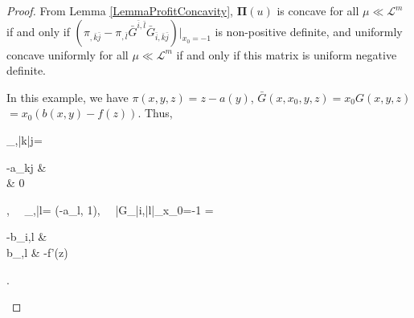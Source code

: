 \begin{proof}%
	From Lemma \ref{LemmaProfitConcavity}, $\pmb \Pi(u)$ is concave for all $\mu\ll \mathcal{L}^m$ if and only if $(\pi_{,\bar{k}\bar{j}}- \pi_{,\bar{l}} \bar{G}^{\bar i,\bar l}\bar{G}_{\bar{i},\bar{k}\bar{j}})\big|_{x_0=-1}$ is non-positive definite, and uniformly concave uniformly for all $\mu\ll \mathcal{L}^m$ if and only if this matrix is uniform negative definite.
	
	In this example, we have $\pi(x,y,z)= z-a(y)$, $\bar{G}(x,x_0, y,z) = x_{0} G(x,y,z)$ $ = x_{0}(b(x,y)-f(z))$. Thus, 
	\begin{flalign*}
	\pi_{,\bar{k}\bar{j}}= \begin{pmatrix}
	-a_{kj} & \\
	 & 0\\
	\end{pmatrix}, \ \ 
	\pi_{,\bar{l}}= (-a_{l}, 1), \ \ 
	\bar{G}_{\bar{i},\bar{l}}\big|_{x_0=-1} = \begin{pmatrix}
	-b_{i,l} & \mathbf{0}\\
	b_{,l} & -f'(z)\\
	\end{pmatrix}.\\	    
	\end{flalign*}
	

\end{proof}
